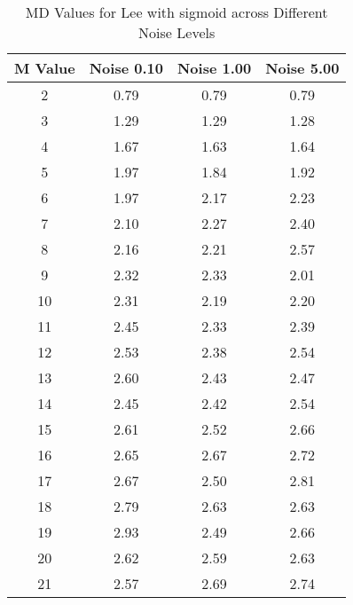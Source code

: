\begin{table}[htb]
\small
\centering
\begin{tabular}{|c|c|c|c|} \hline
M Value & Noise 0.10 & Noise 1.00 & Noise 5.00 \\ \hline
2 & 0.79 & 0.79 & 0.79 \\ \hline
3 & 1.29 & 1.29 & 1.28 \\ \hline
4 & 1.67 & 1.63 & 1.64 \\ \hline
5 & 1.97 & 1.84 & 1.92 \\ \hline
6 & 1.97 & 2.17 & 2.23 \\ \hline
7 & 2.10 & 2.27 & 2.40 \\ \hline
8 & 2.16 & 2.21 & 2.57 \\ \hline
9 & 2.32 & 2.33 & 2.01 \\ \hline
10 & 2.31 & 2.19 & 2.20 \\ \hline
11 & 2.45 & 2.33 & 2.39 \\ \hline
12 & 2.53 & 2.38 & 2.54 \\ \hline
13 & 2.60 & 2.43 & 2.47 \\ \hline
14 & 2.45 & 2.42 & 2.54 \\ \hline
15 & 2.61 & 2.52 & 2.66 \\ \hline
16 & 2.65 & 2.67 & 2.72 \\ \hline
17 & 2.67 & 2.50 & 2.81 \\ \hline
18 & 2.79 & 2.63 & 2.63 \\ \hline
19 & 2.93 & 2.49 & 2.66 \\ \hline
20 & 2.62 & 2.59 & 2.63 \\ \hline
21 & 2.57 & 2.69 & 2.74 \\ \hline
\end{tabular}
\caption{MD Values for Lee with sigmoid across Different Noise Levels}
\end{table}

